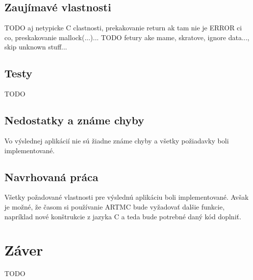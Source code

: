 \section{Zaujímavé vlastnosti}
\label{sec_features}

TODO aj netypicke C clastnosti, prekakovanie return ak tam nie je ERROR ci co, preskakovanie mallock(...)...
TODO fetury ake mame, skratove, ignore data..., skip unknown stuff...

\section{Testy}
TODO

\section{Nedostatky a známe chyby}
Vo výslednej aplikácií nie sú žiadne známe chyby a všetky požiadavky boli implementované.

\section{Navrhovaná práca}
Všetky požadované vlastnosti pre výslednú aplikáciu boli implementované. Avšak je možné, že časom si používanie ARTMC bude vyžadovať dalšie funkcie, napríklad nové konštrukcie z jazyka C a teda bude potrebné daný kód doplniť. 

\chapter{Záver}
TODO

